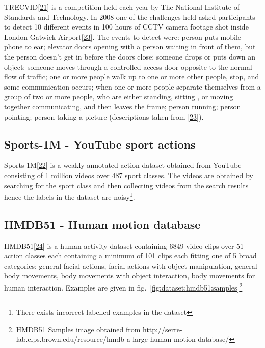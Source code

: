 \documentclass[A4paper,draft]{scrreprt}
\begin{document}
TRECVID{[}\protect\hyperlink{ref-_TRECVIDData}{21}{]} is a competition
held each year by The National Institute of Standards and Technology. In
2008 one of the challenges held asked participants to detect 10
different events in 100 hours of CCTV camera footage shot inside London
Gatwick
Airport{[}\protect\hyperlink{ref-rose2009_TRECVid2008Event}{23}{]}. The
events to detect were: person puts mobile phone to ear; elevator doors
opening with a person waiting in front of them, but the person doesn't
get in before the doors close; someone drops or puts down an object;
someone moves through a controlled access door opposite to the normal
flow of traffic; one or more people walk up to one or more other people,
stop, and some communication occurs; when one or more people separate
themselves from a group of two or more people, who are either standing,
sitting , or moving together communicating, and then leaves the frame;
person running; person pointing; person taking a picture (descriptions
taken from {[}\protect\hyperlink{ref-rose2009_TRECVid2008Event}{23}{]}).

\subsection{Sports-1M - YouTube sport
actions}\label{sports-1m---youtube-sport-actions}

Sports-1M{[}\protect\hyperlink{ref-karpathy2014_LargeScaleVideoClassification}{22}{]}
is a weakly annotated action dataset obtained from YouTube consisting of
1 million videos over 487 sport classes. The videos are obtained by
searching for the sport class and then collecting videos from the search
results hence the labels in the dataset are noisy\footnote{There exists
  incorrect labelled examples in the dataset}.

\subsection{HMDB51 - Human motion
database}\label{hmdb51---human-motion-database}

HMDB51{[}\protect\hyperlink{ref-kuehne2011_HMDBlargevideo}{24}{]} is a
human activity dataset containing 6849 video clips over 51 action
classes each containing a minimum of 101 clips each fitting one of 5
broad categories: general facial actions, facial actions with object
manipulation, general body movements, body movements with object
interaction, body movements for human interaction. Examples are given in
fig.~\ref{fig:dataset:hmdb51:samples}\footnote{HMDB51 Samples image
  obtained from
  http://serre-lab.clps.brown.edu/resource/hmdb-a-large-human-motion-database/}
\end{document}
